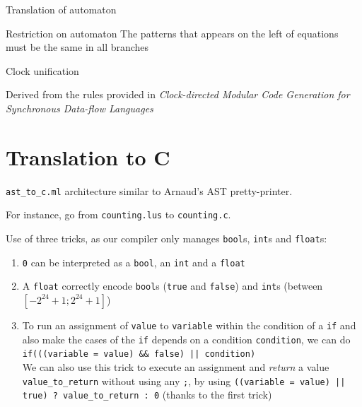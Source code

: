 \documentclass{beamer}
\begin{document}
\begin{frame}[fragile]{Translation of automaton}
	\only<1>{}
	\only<2>{}
\end{frame}
\begin{frame}{Restriction on automaton}
	The patterns that appears on the left of equations must be the
	same in all branches

\end{frame}

\begin{frame}{Clock unification}

	Derived from the rules provided in \emph{Clock-directed Modular Code Generation for Synchronous
	Data-flow Languages}
\end{frame}

\section{Translation to C}
\begin{frame}

	\texttt{ast\_to\_c.ml} architecture similar to Arnaud's AST pretty-printer.

	\pause

	For instance, go from \texttt{counting.lus} to \texttt{counting.c}.

    \pause

	Use of three tricks, as our compiler only manages \texttt{bool}s, \texttt{int}s and \texttt{float}s:
		\begin{enumerate}
			\item \texttt{0} can be interpreted as a \texttt{bool}, an \texttt{int} and a \texttt{float}
			\pause
			\item A \texttt{float} correctly encode \texttt{bool}s (\texttt{true} and \texttt{false}) and \texttt{int}s (between $[-2^{24} + 1; 2^{24} + 1]$)
			\pause
			\item To run an assignment of \texttt{value} to \texttt{variable} within the condition of a \texttt{if} and also make the cases of the \texttt{if} depends on a condition \texttt{condition}, we can do \texttt{if(((variable = value) \&\& false) || condition)}\\
			\pause
			We can also use this trick to execute an assignment and \textit{return} a value \texttt{value\_to\_return} without using any \texttt{;}, by using \texttt{((variable = value) || true) ? value\_to\_return : 0} (thanks to the first trick)
		\end{enumerate}
\end{frame}
\end{document}
